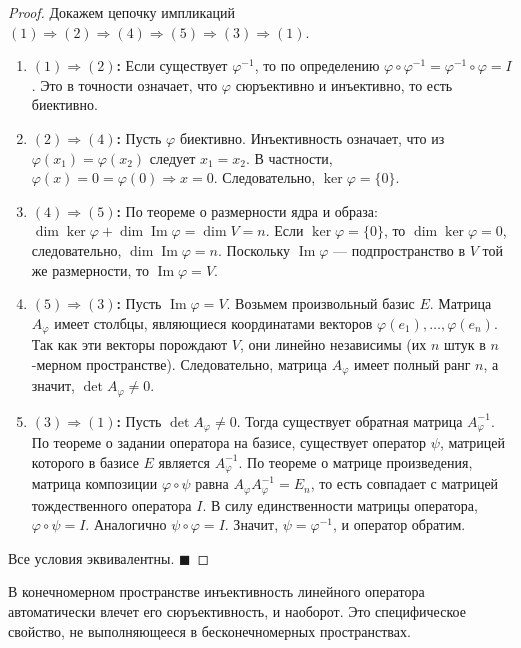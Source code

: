 \begin{proof}
Докажем цепочку импликаций $(1) \Rightarrow (2) \Rightarrow (4) \Rightarrow (5) \Rightarrow (3) \Rightarrow (1)$.

\begin{enumerate}
    \item \textbf{$(1) \Rightarrow (2)$:} Если существует $\varphi^{-1}$, то по определению $\varphi \circ \varphi^{-1} = \varphi^{-1} \circ \varphi = I$. Это в точности означает, что $\varphi$ сюръективно и инъективно, то есть биективно.
    
    \item \textbf{$(2) \Rightarrow (4)$:} Пусть $\varphi$ биективно. Инъективность означает, что из $\varphi(x_1) = \varphi(x_2)$ следует $x_1 = x_2$. В частности, $\varphi(x) = 0 = \varphi(0) \Rightarrow x = 0$. Следовательно, $\ker \varphi = \{0\}$.
    
    \item \textbf{$(4) \Rightarrow (5)$:} По теореме о размерности ядра и образа: $\dim \ker \varphi + \dim \operatorname{Im} \varphi = \dim V = n$. Если $\ker \varphi = \{0\}$, то $\dim \ker \varphi = 0$, следовательно, $\dim \operatorname{Im} \varphi = n$. Поскольку $\operatorname{Im} \varphi$ --- подпространство в $V$ той же размерности, то $\operatorname{Im} \varphi = V$.
    
    \item \textbf{$(5) \Rightarrow (3)$:} Пусть $\operatorname{Im} \varphi = V$. Возьмем произвольный базис $E$. Матрица $A_\varphi$ имеет столбцы, являющиеся координатами векторов $\varphi(e_1), \dots, \varphi(e_n)$. Так как эти векторы порождают $V$, они линейно независимы (их $n$ штук в $n$-мерном пространстве). Следовательно, матрица $A_\varphi$ имеет полный ранг $n$, а значит, $\det A_\varphi \neq 0$.
    
    \item \textbf{$(3) \Rightarrow (1)$:} Пусть $\det A_\varphi \neq 0$. Тогда существует обратная матрица $A_\varphi^{-1}$. По теореме о задании оператора на базисе, существует оператор $\psi$, матрицей которого в базисе $E$ является $A_\varphi^{-1}$. По теореме о матрице произведения, матрица композиции $\varphi \circ \psi$ равна $A_\varphi A_\varphi^{-1} = E_n$, то есть совпадает с матрицей тождественного оператора $I$. В силу единственности матрицы оператора, $\varphi \circ \psi = I$. Аналогично $\psi \circ \varphi = I$. Значит, $\psi = \varphi^{-1}$, и оператор обратим.
\end{enumerate}
Все условия эквивалентны.
\hfill$\blacksquare$
\end{proof}

\begin{remark}
В конечномерном пространстве инъективность линейного оператора автоматически влечет его сюръективность, и наоборот. Это специфическое свойство, не выполняющееся в бесконечномерных пространствах.
\end{remark}
